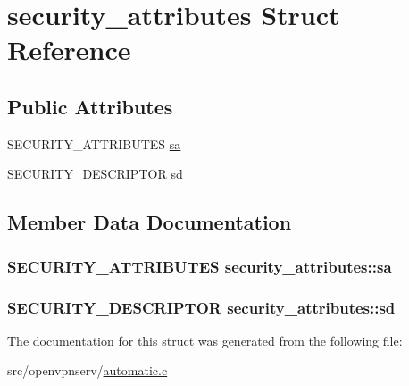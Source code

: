 \hypertarget{structsecurity__attributes}{}\section{security\+\_\+attributes Struct Reference}
\label{structsecurity__attributes}
\subsection*{Public Attributes}
\begin{DoxyCompactItemize}
\item 
S\+E\+C\+U\+R\+I\+T\+Y\+\_\+\+A\+T\+T\+R\+I\+B\+U\+T\+E\+S \hyperlink{structsecurity__attributes_a4a215d7812252afa2a9037fc95ba04df}{sa}
\item 
S\+E\+C\+U\+R\+I\+T\+Y\+\_\+\+D\+E\+S\+C\+R\+I\+P\+T\+O\+R \hyperlink{structsecurity__attributes_ad1f70f75fe77845d69686f86f2f28e35}{sd}
\end{DoxyCompactItemize}


\subsection{Member Data Documentation}
\hypertarget{structsecurity__attributes_a4a215d7812252afa2a9037fc95ba04df}{}
\subsubsection[{sa}]{\setlength{\rightskip}{0pt plus 5cm}S\+E\+C\+U\+R\+I\+T\+Y\+\_\+\+A\+T\+T\+R\+I\+B\+U\+T\+E\+S security\+\_\+attributes\+::sa}\label{structsecurity__attributes_a4a215d7812252afa2a9037fc95ba04df}
\hypertarget{structsecurity__attributes_ad1f70f75fe77845d69686f86f2f28e35}{}
\subsubsection[{sd}]{\setlength{\rightskip}{0pt plus 5cm}S\+E\+C\+U\+R\+I\+T\+Y\+\_\+\+D\+E\+S\+C\+R\+I\+P\+T\+O\+R security\+\_\+attributes\+::sd}\label{structsecurity__attributes_ad1f70f75fe77845d69686f86f2f28e35}


The documentation for this struct was generated from the following file\+:\begin{DoxyCompactItemize}
\item 
src/openvpnserv/\hyperlink{automatic_8c}{automatic.\+c}\end{DoxyCompactItemize}
